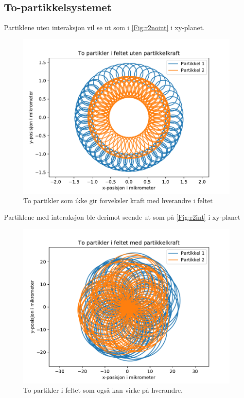 \documentclass[reprint,english,notitlepage, nofootinbib]{revtex4-1}  %
\begin{document}
\subsection*{To-partikkelsystemet}
Partiklene uten interaksjon vil se ut som i \autoref{Fig:r2noint} i xy-planet.
\begin{figure}[H]
	\centering 
	\includegraphics[scale=0.4]{../pythonplots/xypartnoint.pdf}
	\caption{To partikler som ikke gir forveksler kraft med hverandre i feltet}
	\label{Fig:r2noint}
\end{figure}
Partiklene med interaksjon ble derimot seende ut som på \autoref{Fig:r2int} i xy-planet
\begin{figure}[H]
	\centering 
	\includegraphics[scale=0.4]{../pythonplots/xypartint.pdf}
	\caption{To partikler i feltet som også kan virke på hverandre.}
	\label{Fig:r2int}
\end{figure}
\end{document}
